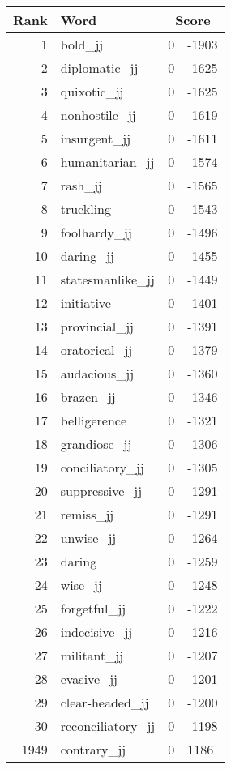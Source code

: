 \begin{longtable}[!htbp]{| rlr@{.}l |}
    \hline
    \textbf{Rank} & \textbf{Word} & \multicolumn{2}{c|}{\textbf{Score}} \\
    \hline
    \endhead
    1 & bold\_jj & 0 & -1903 \\
    2 & diplomatic\_jj & 0 & -1625 \\
    3 & quixotic\_jj & 0 & -1625 \\
    4 & nonhostile\_jj & 0 & -1619 \\
    5 & insurgent\_jj & 0 & -1611 \\
    6 & humanitarian\_jj & 0 & -1574 \\
    7 & rash\_jj & 0 & -1565 \\
    8 & truckling & 0 & -1543 \\
    9 & foolhardy\_jj & 0 & -1496 \\
    10 & daring\_jj & 0 & -1455 \\
    11 & statesmanlike\_jj & 0 & -1449 \\
    12 & initiative & 0 & -1401 \\
    13 & provincial\_jj & 0 & -1391 \\
    14 & oratorical\_jj & 0 & -1379 \\
    15 & audacious\_jj & 0 & -1360 \\
    16 & brazen\_jj & 0 & -1346 \\
    17 & belligerence & 0 & -1321 \\
    18 & grandiose\_jj & 0 & -1306 \\
    19 & conciliatory\_jj & 0 & -1305 \\
    20 & suppressive\_jj & 0 & -1291 \\
    21 & remiss\_jj & 0 & -1291 \\
    22 & unwise\_jj & 0 & -1264 \\
    23 & daring & 0 & -1259 \\
    24 & wise\_jj & 0 & -1248 \\
    25 & forgetful\_jj & 0 & -1222 \\
    26 & indecisive\_jj & 0 & -1216 \\
    27 & militant\_jj & 0 & -1207 \\
    28 & evasive\_jj & 0 & -1201 \\
    29 & clear-headed\_jj & 0 & -1200 \\
    30 & reconciliatory\_jj & 0 & -1198 \\
    1949 & contrary\_jj & 0 & 1186 \\

\end{longtable}
